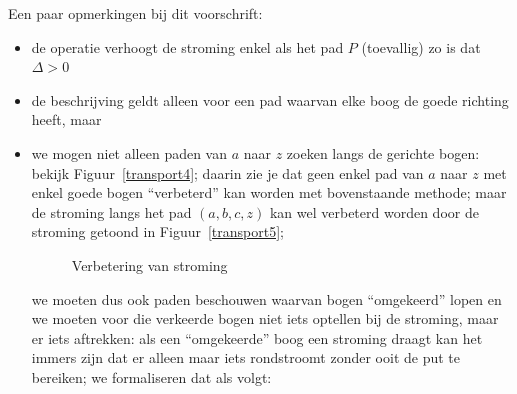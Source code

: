 Een paar opmerkingen bij dit voorschrift:
\begin{itemize}
\item de operatie verhoogt de stroming enkel als het pad $P$ (toevallig)
  zo is dat $\Delta > 0$
\item de beschrijving geldt alleen voor een pad waarvan elke boog de
goede richting heeft, maar
\item we mogen niet alleen paden van $a$ naar $z$ zoeken langs de
gerichte bogen: bekijk Figuur~\ref{transport4}; daarin zie je dat geen
enkel pad van $a$ naar $z$ met enkel goede bogen ``verbeterd'' kan
worden met bovenstaande methode; maar de stroming langs het pad
$(a,b,c,z)$ kan wel verbeterd worden door de stroming getoond in
Figuur~\ref{transport5};

\begin{figure}[ht]
\begin{center}
\hspace{1.2cm}
\end{center}
\caption{Verbetering van stroming}
\end{figure}

we moeten dus ook paden beschouwen waarvan bogen ``omgekeerd'' lopen
en we moeten voor die verkeerde bogen niet iets optellen bij de
stroming, maar er iets aftrekken: als een ``omgekeerde'' boog een stroming
draagt kan het immers zijn dat er alleen maar iets rondstroomt zonder
ooit de put te bereiken; we formaliseren dat als volgt:
\end{itemize}



